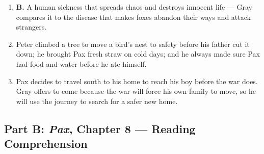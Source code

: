 \documentclass[11pt]{article}
\begin{document}
\begin{enumerate}
  \item \textbf{B.} A human sickness that spreads chaos and destroys innocent life --- Gray compares it to the disease that makes foxes abandon their ways and attack strangers.
  \item Peter climbed a tree to move a bird's nest to safety before his father cut it down; he brought Pax fresh straw on cold days; and he always made sure Pax had food and water before he ate himself.
  \item Pax decides to travel south to his home to reach his boy before the war does. Gray offers to come because the war will force his own family to move, so he will use the journey to search for a safer new home.
\end{enumerate}

\subsection*{Part B: \textit{Pax}, Chapter 8 --- Reading Comprehension}
\end{document}
